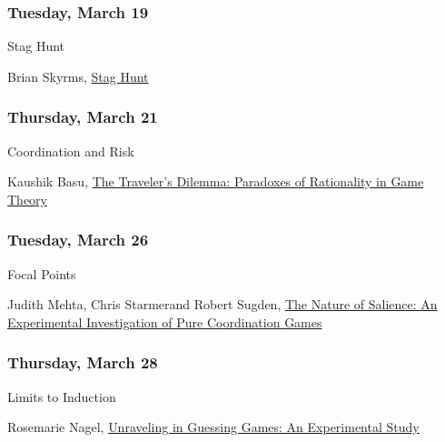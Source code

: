 \documentclass[
  12pt,
  letterpaper,
  DIV=11,
  numbers=noendperiod]{scrartcl}
\providecommand{\tightlist}{%
  \setlength{\itemsep}{0pt}\setlength{\parskip}{0pt}}\usepackage{longtable,booktabs,array}
\begin{document}
\subsubsection{Tuesday, March 19}\label{tuesday-march-19}

\begin{description}
\tightlist
\item[Topic]
Stag Hunt
\item[Reading]
Brian Skyrms, \href{https://www.jstor.org/stable/3218711}{Stag Hunt}
\end{description}

\subsubsection{Thursday, March 21}\label{thursday-march-21}

\begin{description}
\tightlist
\item[Topic]
Coordination and Risk
\item[Reading]
Kaushik Basu, \href{https://www.jstor.org/stable/2117865}{The Traveler's
Dilemma: Paradoxes of Rationality in Game Theory}
\end{description}

\subsubsection{Tuesday, March 26}\label{tuesday-march-26}

\begin{description}
\tightlist
\item[Topic]
Focal Points
\item[Reading]
Judith Mehta, Chris Starmerand Robert Sugden,
\href{https://www.jstor.org/stable/2118074}{The Nature of Salience: An
Experimental Investigation of Pure Coordination Games}
\end{description}

\subsubsection{Thursday, March 28}\label{thursday-march-28}

\begin{description}
\tightlist
\item[Topic]
Limits to Induction
\item[Reading]
Rosemarie Nagel, \href{https://www.jstor.org/stable/2950991}{Unraveling
in Guessing Games: An Experimental Study}
\end{description}
\end{document}
